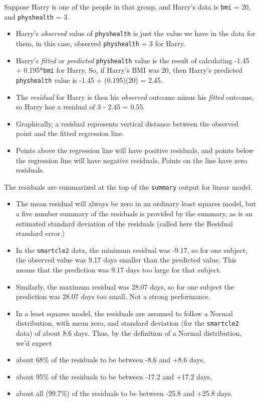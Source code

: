 \documentclass[]{book}
\providecommand{\tightlist}{%
  \setlength{\itemsep}{0pt}\setlength{\parskip}{0pt}}
\theoremstyle{definition}
\theoremstyle{definition}
\theoremstyle{definition}
\theoremstyle{remark}
\begin{document}
Suppose Harry is one of the people in that group, and Harry's data is
\texttt{bmi} = 20, and \texttt{physhealth} = 3.

\begin{itemize}
\tightlist
\item
  Harry's \emph{observed} value of \texttt{physhealth} is just the value
  we have in the data for them, in this case, observed
  \texttt{physhealth} = 3 for Harry.
\item
  Harry's \emph{fitted} or \emph{predicted} \texttt{physhealth} value is
  the result of calculating -1.45 + 0.195*\texttt{bmi} for Harry. So, if
  Harry's BMI was 20, then Harry's predicted \texttt{physhealth} value
  is -1.45 + (0.195)(20) = 2.45.
\item
  The \emph{residual} for Harry is then his \emph{observed} outcome
  minus his \emph{fitted} outcome, so Harry has a residual of 3 - 2.45 =
  0.55.
\item
  Graphically, a residual represents vertical distance between the
  observed point and the fitted regression line.
\item
  Points above the regression line will have positive residuals, and
  points below the regression line will have negative residuals. Points
  on the line have zero residuals.
\end{itemize}

The residuals are summarized at the top of the \texttt{summary} output
for linear model.

\begin{itemize}
\tightlist
\item
  The mean residual will always be zero in an ordinary least squares
  model, but a five number summary of the residuals is provided by the
  summary, as is an estimated standard deviation of the residuals
  (called here the Residual standard error.)
\item
  In the \texttt{smartcle2} data, the minimum residual was -9.17, so for
  one subject, the observed value was 9.17 days smaller than the
  predicted value. This means that the prediction was 9.17 days too
  large for that subject.
\item
  Similarly, the maximum residual was 28.07 days, so for one subject the
  prediction was 28.07 days too small. Not a strong performance.
\item
  In a least squares model, the residuals are assumed to follow a Normal
  distribution, with mean zero, and standard deviation (for the
  \texttt{smartcle2} data) of about 8.6 days. Thus, by the definition of
  a Normal distribution, we'd expect
\item
  about 68\% of the residuals to be between -8.6 and +8.6 days,
\item
  about 95\% of the residuals to be between -17.2 and +17.2 days,
\item
  about all (99.7\%) of the residuals to be between -25.8 and +25.8
  days.
\end{itemize}
\end{document}
